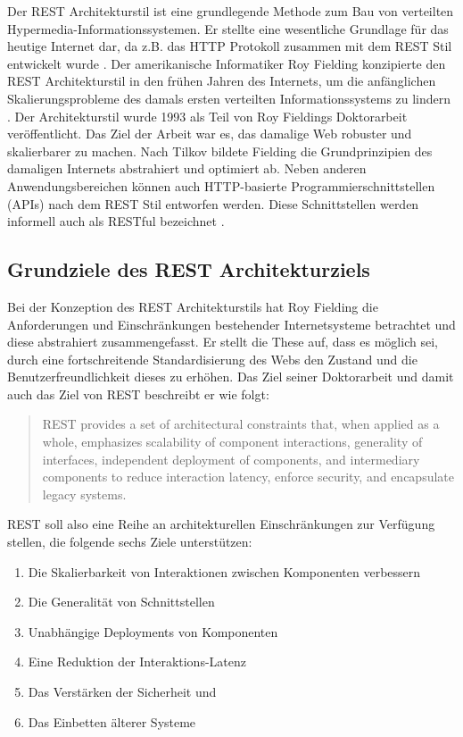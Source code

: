Der REST Architekturstil ist eine grundlegende Methode zum Bau von verteilten Hypermedia-Informationssystemen. Er stellte eine wesentliche Grundlage für das heutige Internet dar, da z.B. das HTTP Protokoll zusammen mit dem REST Stil entwickelt wurde . Der amerikanische Informatiker Roy Fielding konzipierte den REST Architekturstil in den frühen Jahren des Internets, um die anfänglichen Skalierungsprobleme des damals ersten verteilten Informationssystems zu lindern . Der Architekturstil wurde 1993 als Teil von Roy Fieldings Doktorarbeit veröffentlicht. Das Ziel der Arbeit war es, das damalige Web robuster und skalierbarer zu machen. Nach Tilkov bildete Fielding die Grundprinzipien des damaligen Internets abstrahiert und optimiert ab. Neben anderen Anwendungsbereichen können auch HTTP-basierte Programmierschnittstellen (APIs) nach dem REST Stil entworfen werden. Diese Schnittstellen werden informell auch als RESTful bezeichnet . 

\subsection{Grundziele des REST Architekturziels}\label{subsection:grundziele-des-rest}

Bei der Konzeption des REST Architekturstils hat Roy Fielding die Anforderungen und Einschränkungen bestehender Internetsysteme betrachtet und diese abstrahiert zusammengefasst. Er stellt die These auf, dass es möglich sei, durch eine fortschreitende Standardisierung des Webs den Zustand und die Benutzerfreundlichkeit dieses zu erhöhen. Das Ziel seiner Doktorarbeit und damit auch das Ziel von REST beschreibt er wie folgt:

\begin{quote}
    REST provides a set of architectural constraints that, when applied as a whole, emphasizes scalability of component interactions, generality of interfaces, independent deployment of components, and intermediary components to reduce interaction latency, enforce security, and encapsulate legacy systems.
\end{quote}

REST soll also eine Reihe an architekturellen Einschränkungen zur Verfügung stellen, die folgende sechs Ziele unterstützen:

\begin{enumerate}
    \item Die Skalierbarkeit von Interaktionen zwischen Komponenten verbessern
    \item Die Generalität von Schnittstellen
    \item Unabhängige Deployments von Komponenten
    \item Eine Reduktion der Interaktions-Latenz
    \item Das Verstärken der Sicherheit und
    \item Das Einbetten älterer Systeme
\end{enumerate}

